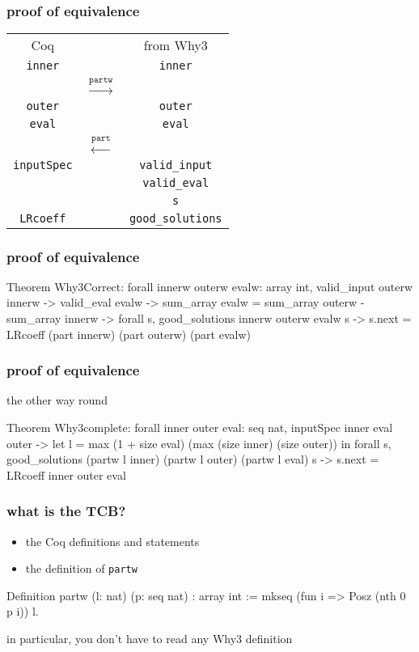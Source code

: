 \documentclass{beamer}
\let\emph\alert
\begin{document}
\begin{frame}\frametitle{proof of equivalence}
  \begin{center}
    \begin{tabular}{ccc}
      \emph{Coq} & & \emph{from Why3} \\[1em]
      \texttt{inner} & &       \texttt{inner} \\[-1em]
      & $\stackrel{\mathtt{partw}}{\longrightarrow}$
      & \\[-0.5em]
      \texttt{outer} & &\texttt{outer} \\
      \texttt{eval} & &       \texttt{eval} \\[-1.5em]
      & $\stackrel{\mathtt{part}}{\longleftarrow}$ & \\[1em]
      \texttt{inputSpec} & & \texttt{valid\_input} \\
                         & & \texttt{valid\_eval} \\
                         & & \texttt{s} \\
      \texttt{LRcoeff}   & & \texttt{good\_solutions}
    \end{tabular}
  \end{center}
\end{frame}

\begin{frame}[fragile]\frametitle{proof of equivalence}
\begin{coq}
Theorem Why3Correct:
  forall innerw outerw evalw: array int,
  valid_input outerw innerw ->
  valid_eval evalw ->
  sum_array evalw =
    sum_array outerw - sum_array innerw ->
  forall s, good_solutions innerw outerw evalw s ->
  s.next =
    LRcoeff (part innerw) (part outerw) (part evalw)
\end{coq}
\end{frame}

\begin{frame}[fragile]\frametitle{proof of equivalence}
the other way round
\bigskip
\begin{coq}
Theorem Why3complete:
  forall inner outer eval: seq nat,
  inputSpec inner eval outer ->
  let l = max (1 + size eval)
              (max (size inner) (size outer)) in
  forall s,
  good_solutions (partw l inner)
                 (partw l outer) (partw l eval) s ->
  s.next = LRcoeff inner outer eval
\end{coq}
\end{frame}

\begin{frame}[fragile]\frametitle{what is the TCB?}
  \begin{itemize}
  \item the Coq definitions and statements
  \item the definition of \texttt{partw}
  \end{itemize}
\begin{coq}
Definition partw (l: nat) (p: seq nat) : array int :=
  mkseq (fun i => Posz (nth 0 p i)) l.
\end{coq}

  \bigskip
  in particular, you don't have to read \emph{any} Why3 definition
\end{frame}
\end{document}
